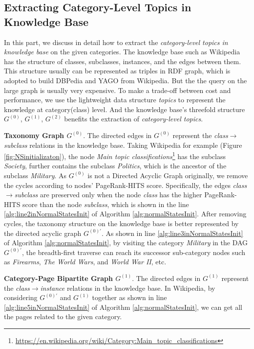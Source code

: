 \documentclass[runningheads,a4paper]{llncs}
\theoremstyle{exampstyle}
\begin{document}
\subsection{Extracting Category-Level Topics in Knowledge Base}\label{subsec:hs_initialization}
In this part, we discuss in detail how to extract the \textit{category-level topics in knowledge base} on the given categories. 
The knowledge base such as Wikipedia has the structure of classes, subclasses, instances, and the edges between them. 
This structure usually can be represented as triples in RDF graph\cite{klyne2006rdf}, which is adopted to build DBPedia\cite{auer2007dbpedia} and YAGO\cite{suchanek2007yago} from Wikipedia. 
But the the query on the large graph is usually very expensive\cite{huang2011scalable}. 
To make a trade-off between cost and performance, we use the lightweight data structure \textit{topics} to represent the knowledge at category(class) level.
And the knowledge base's threefold structure \(G^{(0)}\), \(G^{(1)}\), \(G^{(2)}\) benefits the extraction of \textit{category-level topics}. 

\textbf{Taxonomy Graph \(G^{(0)}\)}. The directed edges in \(G^{(0)}\) represent the \textit{class}\(\rightarrow\)\textit{subclass} relations in the knowledge base. 
Taking Wikipedia for example (Figure \ref{fig:NSinitializaton}), the node \textit{Main topic classifications}\footnote{\url{https://en.wikipedia.org/wiki/Category:Main_topic_classifications}} has the subclass \textit{Society}, further contains the subclass \textit{Politics}, which is the ancestor of the subclass \textit{Military}.
As \(G^{(0)}\) is not a Directed Acyclic Graph originally\cite{faralli2015large}, we remove the cycles according to nodes' PageRank-HITS\cite{Yan:2015wq} score.
Specifically, the edges \textit{class}\(\rightarrow\)\textit{subclass} are preserved only when the node \textit{class} has the higher PageRank-HITS score than the node \textit{subclass}, which is shown in the line \ref{alg:line2inNormalStatesInit} of Algorithm \ref{alg:normalStatesInit}.
After removing cycles, the taxonomy structure on the knowledge base is better represented by the directed acyclic graph \(G^{(0)'}\).
As shown in line \ref{alg:line3inNormalStatesInit} of Algorithm \ref{alg:normalStatesInit}, by visiting the category \textit{Military} in the DAG \(G^{(0)'}\), the breadth-first traverse can reach its successor sub-category nodes such as \textit{Firearms}, \textit{The World Wars}, and \textit{World War II}, etc. 

\textbf{Category-Page Bipartite Graph \(G^{(1)}\)}. 
The directed edges in \(G^{(1)}\) represent the \textit{class}\(\rightarrow\)\textit{instance} relations in the knowledge base.
In Wikipedia, by considering \(G^{(0)'}\) and \(G^{(1)}\) together as shown in line \ref{alg:line5inNormalStatesInit} of Algorithm \ref{alg:normalStatesInit}, we can get all the pages related to the given category. 
\end{document}
